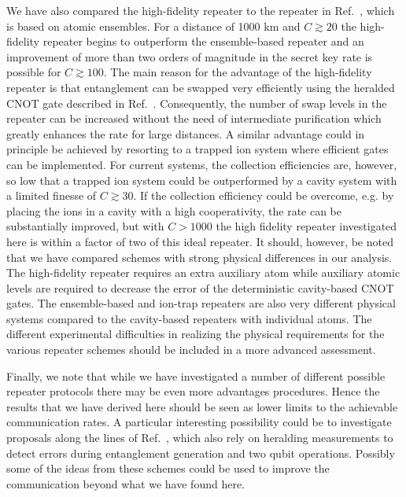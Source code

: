 We have also compared the high-fidelity repeater to the repeater in
Ref.~\cite{sangouard1}, which is based on atomic ensembles. For a distance of
1000 km and $C\gtrsim20$ the high-fidelity repeater begins to outperform the
ensemble-based repeater and an improvement of more than two orders of magnitude
in the secret key rate is possible for $C\gtrsim100$. The main reason for the
advantage of the high-fidelity repeater is that entanglement can be swapped very
efficiently using the heralded CNOT gate described in Ref.~\cite{johannes}.
Consequently, the number of swap levels in the repeater can be increased without
the need of intermediate purification which greatly enhances the rate for large
distances. A similar advantage could in principle be achieved by resorting to a
trapped ion system where efficient gates can be implemented. For current
systems, the collection efficiencies are, however, so low that a trapped ion
system could be outperformed by a cavity system with a limited finesse of
$C\gtrsim 30$. If the collection efficiency could be overcome, e.g. by placing
the ions in a cavity with a high cooperativity, the rate can be substantially
improved, but with $C>1000$ the high fidelity repeater investigated here is
within a factor of two of this ideal repeater. It should, however, be noted that
we have compared schemes with strong physical differences in our analysis. The
high-fidelity repeater requires an extra auxiliary atom while auxiliary atomic
levels are required to decrease the error of the deterministic cavity-based CNOT
gates. The ensemble-based and ion-trap repeaters are also very different
physical systems compared to the cavity-based repeaters with individual atoms.
The different experimental difficulties in realizing the physical requirements
for the various repeater schemes should be included in a more advanced
assessment.

Finally, we note that while we have investigated a number of different possible
repeater protocols there may be even more advantages procedures. Hence the
results that we have derived here should be seen as lower limits to the
achievable communication rates. A particular interesting  possibility could be
to investigate proposals along the lines of Ref.~\cite{cirac1,cirac2}, which
also rely on heralding measurements to detect errors during entanglement
generation and two qubit operations.  Possibly some of the ideas from these
schemes could be used to improve the communication beyond what we have found
here.
  
